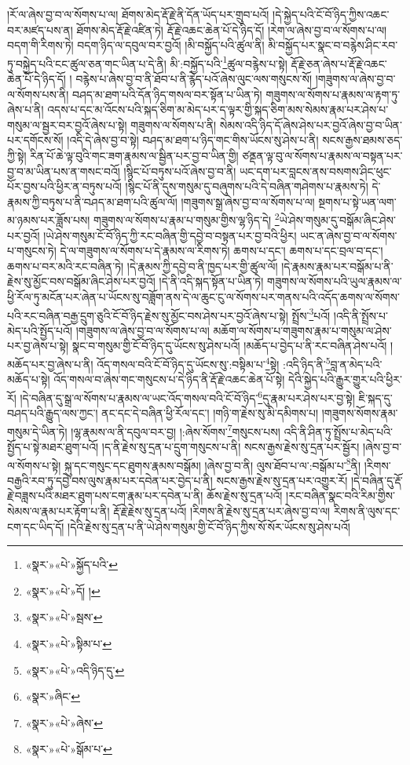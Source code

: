 །རོ་ལ་ཞེས་བྱ་བ་ལ་སོགས་པ་ལ། ཐོགས་མེད་རྡོ་རྗེ་ནི་དོན་ཡོད་པར་གྲུབ་པའོ། །དེ་སྐྱེད་པའི་ངོ་བོ་ཉིད་ཀྱིས་འཆང་བར་མཛད་པས་ན། ཐོགས་མེད་རྡོ་རྗེ་འཛིན་ཏེ། རྡོ་རྗེ་འཆང་ཆེན་པོ་དེ་ཉིད་དོ། །རེག་ལ་ཞེས་བྱ་བ་ལ་སོགས་པ་ལ། བདག་གི་རིགས་ཏེ། བདག་ཉིད་ལ་དབུལ་བར་བྱའོ། །མི་བསྐྱོད་པའི་ཚུལ་ནི། མི་བསྐྱོད་པར་སྣང་བ་བརྙེས་ཤིང་རབ་ཏུ་བསྐྱེད་པའི་ངང་ཚུལ་ཅན་གང་ཡིན་པ་དེ་ནི། མི་:བསྐྱོད་པའི་\footnote{«སྣར་»«པེ་»སྐྱོད་པའི་}ཚུལ་བརྙེས་པ་སྟེ། རྡོ་རྗེ་ཅན་ཞེས་པ་རྡོ་རྗེ་འཆང་ཆེན་པོ་དེ་ཉིད་དོ། །
བརྙེས་པ་ཞེས་བྱ་བ་ནི་ཐོབ་པ་ནི་རྙེད་པའོ་ཞེས་ལུང་ལས་གསུངས་སོ། །གཟུགས་ལ་ཞེས་བྱ་བ་ལ་སོགས་པས་ནི། བཤད་མ་ཐག་པའི་དོན་ཉིད་གསལ་བར་སྟོན་པ་ཡིན་ཏེ། གཟུགས་ལ་སོགས་པ་རྣམས་ལ་རྟག་ཏུ་ཞེས་པ་ནི། འདས་པ་དང་མ་འོངས་པའི་སྐད་ཅིག་མ་མེད་པར་ད་ལྟར་གྱི་སྐད་ཅིག་མས་སེམས་རྣམ་པར་ཤེས་པ་གསུམ་ལ་སྦྱར་བར་བྱའོ་ཞེས་པ་སྟེ། གཟུགས་ལ་སོགས་པ་ནི། སེམས་འདི་ཉིད་དོ་ཞེས་ཤེས་པར་བྱའོ་ཞེས་བྱ་བ་ཡིན་པར་དགོངས་སོ། །འདི་དེ་ཞེས་བྱ་བ་སྟེ། བཤད་མ་ཐག་པ་ཉིད་གང་གིས་ཡོངས་སུ་ཤེས་པ་ནི། སངས་རྒྱས་ཐམས་ཅད་ཀྱི་སྟེ། རིན་པོ་ཆེ་ལྟ་བུའི་གང་ཟག་རྣམས་ལ་སྦྱིན་པར་བྱ་བ་ཡིན་གྱི། ཙནྡན་ལྟ་བུ་ལ་སོགས་པ་རྣམས་ལ་བསྟན་པར་བྱ་བ་མ་ཡིན་པས་ན་གསང་བའོ། །སྙིང་པོ་བཏུས་པའོ་ཞེས་བྱ་བ་ནི། ཡང་དག་པར་བླངས་ནས་བསགས་ཤིང་ཕུང་པོར་བྱས་པའི་ཕྱིར་ན་བཏུས་པའོ། །སྙིང་པོ་ནི་དུས་གསུམ་དུ་བཞུགས་པའི་དེ་བཞིན་གཤེགས་པ་རྣམས་ཏེ། དེ་རྣམས་ཀྱི་བཏུས་པ་ནི་བཤད་མ་ཐག་པའི་ཚུལ་ལོ། །གཟུགས་སྒྲ་ཞེས་བྱ་བ་ལ་སོགས་པ་ལ། སྔགས་པ་སྟེ་ཡན་ལག་མ་ཉམས་པར་ཟློས་པས། གཟུགས་ལ་སོགས་པ་རྣམ་པ་གསུམ་གྱིས་ལྷ་ཉིད་དེ། \footnote{«སྣར་»«པེ་»དོ། ། }ཡེ་ཤེས་གསུམ་དུ་བསྒོམ་ཞིང་ཤེས་པར་བྱའོ། །ཡེ་ཤེས་གསུམ་ངོ་བོ་ཉིད་ཀྱི་རང་བཞིན་གྱི་དབྱེ་བ་བསྟན་པར་བྱ་བའི་ཕྱིར། ཡང་ན་ཞེས་བྱ་བ་ལ་སོགས་པ་གསུངས་ཏེ། དེ་ལ་གཟུགས་ལ་སོགས་པ་དེ་རྣམས་ལ་རིགས་ཏེ། ཆགས་པ་དང་། ཆགས་པ་དང་བྲལ་བ་དང་། ཆགས་པ་བར་མའི་རང་བཞིན་ཏེ། །དེ་རྣམས་ཀྱི་དབྱེ་བ་ནི་ཁྱད་པར་གྱི་ཚུལ་ལོ། །དེ་རྣམས་རྣམ་པར་བསྒོམ་པ་ནི་རྗེས་སུ་མྱོང་བས་བསྒོམ་ཞིང་ཤེས་པར་བྱའོ། །དེ་ནི་འདི་སྐད་སྟོན་པ་ཡིན་ཏེ། གཟུགས་ལ་སོགས་པའི་ཡུལ་རྣམས་ལ་ཕྱི་རོལ་ཏུ་མངོན་པར་ཞེན་པ་ཡོངས་སུ་བཟློག་ནས་དེ་ལ་ཆུང་ངུ་ལ་སོགས་པར་གནས་པའི་འདོད་ཆགས་ལ་སོགས་པའི་རང་བཞིན་བརྒྱ་དྲུག་ཅུའི་ངོ་བོ་ཉིད་རྗེས་སུ་མྱོང་བས་ཤེས་པར་བྱའོ་ཞེས་པ་སྟེ། སྤྲོས་\footnote{«སྣར་»«པེ་»སྦས་}པའོ། །འདི་ནི་སྤྲོས་པ་མེད་པའི་སྤྱོད་པའོ། །གཟུགས་ལ་ཞེས་བྱ་བ་ལ་སོགས་པ་ལ། མཆོག་ལ་སོགས་པ་གཟུགས་རྣམ་པ་གསུམ་ལ་ཤེས་པར་བྱ་ཞེས་པ་སྟེ། སྣང་བ་གསུམ་གྱི་ངོ་བོ་ཉིད་དུ་ཡོངས་སུ་ཤེས་པའོ། །མཆོད་པ་བྱེད་པ་ནི་རང་བཞིན་ཤེས་པའོ། །མཆོད་པར་བྱ་ཞེས་པ་ནི། འོད་གསལ་བའི་ངོ་བོ་ཉིད་དུ་ཡོངས་སུ་:བསྟིམ་པ་\footnote{«སྣར་»«པེ་»སྟིམ་པ་}སྟེ། :འདི་ཉིད་ནི་\footnote{«སྣར་»«པེ་»འདི་ཉིད་དུ་}བླ་ན་མེད་པའི་མཆོད་པ་སྟེ། འོད་གསལ་བ་ཞེས་གང་གསུངས་པ་དེ་ཉིད་ནི་རྡོ་རྗེ་འཆང་ཆེན་པོ་སྟེ། དེའི་སྐྱེད་པའི་རྒྱུར་གྱུར་པའི་ཕྱིར་རོ། །དེ་བཞིན་དུ་སྒྲ་ལ་སོགས་པ་རྣམས་ལ་ཡང་འོད་གསལ་བའི་ངོ་བོ་ཉིད་\footnote{«སྣར་»ཞིང་}དུ་རྣམ་པར་ཤེས་པར་བྱ་སྟེ། ཇི་སྐད་དུ་བཤད་པའི་རྒྱུད་ལས་ཀྱང་། ནང་དང་དེ་བཞིན་ཕྱི་རོལ་དང་། །གཉི་ག་རྗེས་སུ་མི་དམིགས་པ། །གཟུགས་སོགས་རྣམ་གསུམ་དེ་ཡིན་ཏེ། །ལྷ་རྣམས་ལ་ནི་དབུལ་བར་བྱ། །:ཞེས་སོགས་\footnote{«སྣར་»«པེ་»ཞེས་}གསུངས་པས། འདི་ནི་ཤིན་ཏུ་སྤྲོས་པ་མེད་པའི་སྤྱོད་པ་སྟེ་མཐར་ཐུག་པའོ། །ད་ནི་རྗེས་སུ་དྲན་པ་དྲུག་གསུངས་པ་ནི། སངས་རྒྱས་རྗེས་སུ་དྲན་པར་སྦྱོར། །ཞེས་བྱ་བ་ལ་སོགས་པ་སྟེ། སྐུ་དང་གསུང་དང་ཐུགས་རྣམས་བསྒོམ། །ཞེས་བྱ་བ་ནི། ལུས་ཐོབ་པ་ལ་:བསྒོམ་པ་\footnote{«སྣར་»«པེ་»སྒོམ་པ་}ནི། །རིགས་བརྒྱའི་རབ་ཏུ་དབྱེ་བས་ལུས་རྣམ་པར་དབེན་པར་བྱེད་པ་ནི། སངས་རྒྱས་རྗེས་སུ་དྲན་པར་འགྱུར་རོ། །དེ་བཞིན་དུ་རྡོ་རྗེ་བཟླས་པའི་མཐར་ཐུག་པས་ངག་རྣམ་པར་དབེན་པ་ནི། ཆོས་རྗེས་སུ་དྲན་པའོ། །རང་བཞིན་སྣང་བའི་རིམ་གྱིས་སེམས་ལ་རྣམ་པར་རྟོག་པ་ནི། རྡོ་རྗེ་རྗེས་སུ་དྲན་པའོ། །རིགས་ནི་རྗེས་སུ་དྲན་པར་ཞེས་བྱ་བ་ལ། རིགས་ནི་ལུས་དང་ངག་དང་ཡིད་དོ། །དེའི་རྗེས་སུ་དྲན་པ་ནི་ཡེ་ཤེས་གསུམ་གྱི་ངོ་བོ་ཉིད་ཀྱིས་སོ་སོར་ཡོངས་སུ་ཤེས་པའོ། 